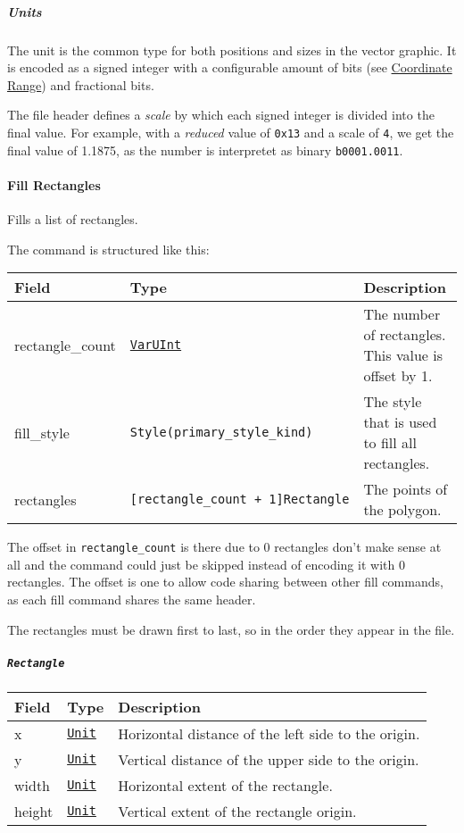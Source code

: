 \documentclass[
]{article}
\begin{document}
\hypertarget{units}{%
\subparagraph{Units}\label{units}}

The unit is the common type for both positions and sizes in the vector
graphic. It is encoded as a signed integer with a configurable amount of
bits (see \protect\hyperlink{coordinate-range}{Coordinate Range}) and
fractional bits.

The file header defines a \emph{scale} by which each signed integer is
divided into the final value. For example, with a \emph{reduced} value
of \texttt{0x13} and a scale of \texttt{4}, we get the final value of
1.1875, as the number is interpretet as binary \texttt{b0001.0011}.

\hypertarget{fill-rectangles}{%
\paragraph{Fill Rectangles}\label{fill-rectangles}}

Fills a list of rectangles.

The command is structured like this:

\begin{longtable}[]{@{}lll@{}}
\toprule
Field & Type & Description \\
\midrule
\endhead
rectangle\_count & \protect\hyperlink{varuint}{\texttt{VarUInt}} & The
number of rectangles. This value is offset by 1. \\
fill\_style & \texttt{Style(primary\_style\_kind)} & The style that is
used to fill all rectangles. \\
rectangles & \texttt{{[}rectangle\_count\ +\ 1{]}Rectangle} & The points
of the polygon. \\
\bottomrule
\end{longtable}

The offset in \texttt{rectangle\_count} is there due to 0 rectangles
don't make sense at all and the command could just be skipped instead of
encoding it with 0 rectangles. The offset is one to allow code sharing
between other fill commands, as each fill command shares the same
header.

The rectangles must be drawn first to last, so in the order they appear
in the file.

\hypertarget{rectangle}{%
\subparagraph{\texorpdfstring{\texttt{Rectangle}}{Rectangle}}\label{rectangle}}

\begin{longtable}[]{@{}lll@{}}
\toprule
Field & Type & Description \\
\midrule
\endhead
x & \protect\hyperlink{units}{\texttt{Unit}} & Horizontal distance of
the left side to the origin. \\
y & \protect\hyperlink{units}{\texttt{Unit}} & Vertical distance of the
upper side to the origin. \\
width & \protect\hyperlink{units}{\texttt{Unit}} & Horizontal extent of
the rectangle. \\
height & \protect\hyperlink{units}{\texttt{Unit}} & Vertical extent of
the rectangle origin. \\
\bottomrule
\end{longtable}
\end{document}
